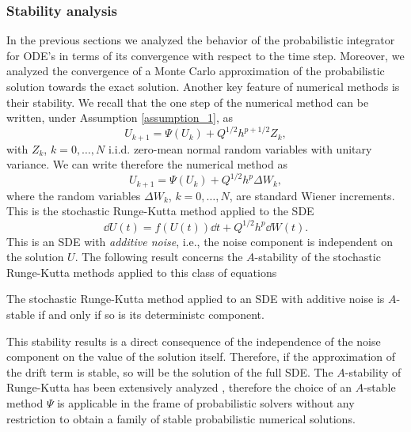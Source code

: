 \subsubsection{Stability analysis}

In the previous sections we analyzed the behavior of the probabilistic integrator for ODE's in terms of its convergence with respect to the time step. Moreover, we analyzed the convergence of a Monte Carlo approximation of the probabilistic solution towards the exact solution. Another key feature of numerical methods is their stability. We recall that the one step of the numerical method can be written, under Assumption \ref{assumption_1}, as
\begin{equation}
	U_{k+1} = \Psi(U_{k}) + Q^{1/2}h^{p+1/2}Z_k,
\end{equation}
with $Z_k$, $k = 0, \ldots, N$ i.i.d. zero-mean normal random variables with unitary variance. We can write therefore the numerical method as
\begin{equation}
	U_{k+1} = \Psi(U_{k}) + Q^{1/2}h^{p}\Delta W_k,
\end{equation}
where the random variables $\Delta W_k$, $k = 0, \ldots, N$, are standard Wiener increments. This is the stochastic Runge-Kutta method applied to the SDE
\begin{equation}
	\dd U(t) = f(U(t))\dd t + Q^{1/2}h^p \dd W(t).
\end{equation}
This is an SDE with \textit{additive noise}, i.e., the noise component is independent on the solution $U$. The following result concerns the $A$-stability of the stochastic Runge-Kutta methods applied to this class of equations \cite[Theorem 4.1.]{HeS92}
\begin{theorem} The stochastic Runge-Kutta method applied to an SDE with additive noise is $A$-stable if and only if so is its deterministc component.
\end{theorem}
\noindent This stability results is a direct consequence of the independence of the noise component on the value of the solution itself. Therefore, if the approximation of the drift term is stable, so will be the solution of the full SDE. The $A$-stability of Runge-Kutta has been extensively analyzed \cite{HaW96}, therefore the choice of an $A$-stable method $\Psi$ is applicable in the frame of probabilistic solvers without any restriction to obtain a family of stable probabilistic numerical solutions.